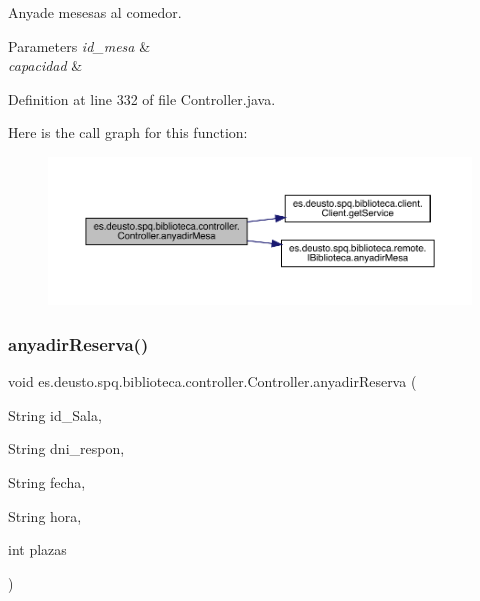 Anyade mesesas al comedor. 
\begin{DoxyParams}{Parameters}
{\em id\+\_\+mesa} & \\
\hline
{\em capacidad} & \\
\hline
\end{DoxyParams}


Definition at line 332 of file Controller.\+java.

Here is the call graph for this function\+:
\nopagebreak
\begin{figure}[H]
\begin{center}
\leavevmode
\includegraphics[width=350pt]{classes_1_1deusto_1_1spq_1_1biblioteca_1_1controller_1_1_controller_a502ed4103be18f51da6bc2a87b03e77f_cgraph}
\end{center}
\end{figure}
\mbox{\label{classes_1_1deusto_1_1spq_1_1biblioteca_1_1controller_1_1_controller_ac3d198e961cb93301dce00484cf462a8}} 
\subsubsection{\texorpdfstring{anyadir\+Reserva()}{anyadirReserva()}}
{\footnotesize\ttfamily void es.\+deusto.\+spq.\+biblioteca.\+controller.\+Controller.\+anyadir\+Reserva (\begin{DoxyParamCaption}\item[{String}]{id\+\_\+\+Sala,  }\item[{String}]{dni\+\_\+respon,  }\item[{String}]{fecha,  }\item[{String}]{hora,  }\item[{int}]{plazas }\end{DoxyParamCaption})}

